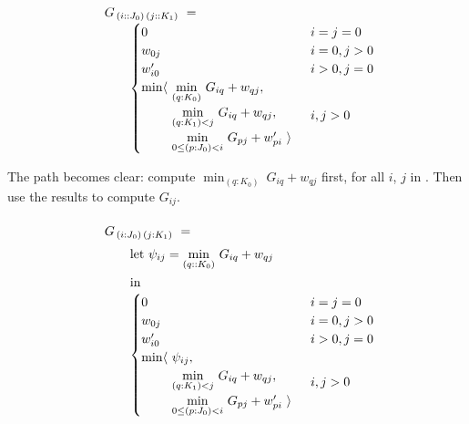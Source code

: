 \begin{equation}\LeftEqNo
\renewcommand\arraystretch{1.5}
\begin{array}{l@{}l}
	G_{\,(i :: J_0)\,(j :: K_1)} ~=~  \\
	\qquad
	\begin{cases}
		0                        & i=j=0 \\
		w_{0j}                   & i=0, j>0 \\
		w'_{i0}                  & i>0, j=0 \\
		\begin{array}{@{}l@{~}l}
		  \min\langle & \underset{(q:K_0)}\min ~ G_{iq} + w_{qj}, \\
		              & \underset{(q:K_1) <j}\min ~ G_{iq} + w_{qj}, \\
		              & \underset{0\leq (p:J_0) <i}\min ~ G_{pj} + w'_{pi}~\rangle
		\end{array}              & i,j>0
	\end{cases}
\end{array}
\end{equation}

The path becomes clear: compute $\min_{(q:K_0)} ~ G_{iq} + w_{qj}$ first, for all $i$, $j$
in . Then use the results to compute $G_{ij}$.

\begin{equation}\LeftEqNo
\renewcommand\arraystretch{1.5}
\begin{array}{l@{}l}
	G_{\,(i : J_0)\,(j : K_1)} ~=~  \\
	\qquad
	\textrm{let}~\psi_{ij} = \underset{(q::K_0)}\min ~ G_{iq} + w_{qj} \\
	\qquad\textrm{in} \\
	\qquad
	\begin{cases}
		0                        & i=j=0 \\
		w_{0j}                   & i=0, j>0 \\
		w'_{i0}                  & i>0, j=0 \\
		\begin{array}{@{}l@{~}l}
		  \min\langle & \psi_{ij}, \\
		              & \underset{(q:K_1) <j}\min ~ G_{iq} + w_{qj}, \\
		              & \underset{0\leq (p:J_0) <i}\min ~ G_{pj} + w'_{pi}~\rangle
		\end{array}              & i,j>0
	\end{cases}
\end{array}
\label{intro:let in 2}
\end{equation}


